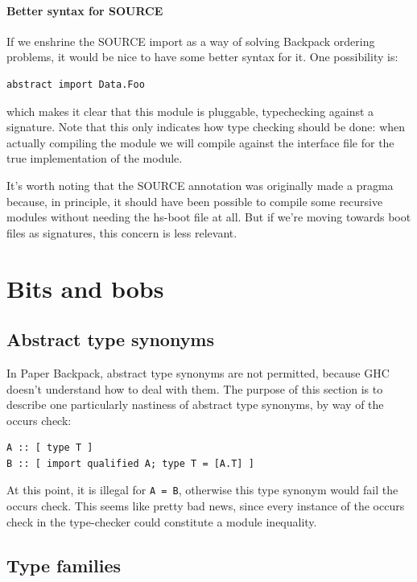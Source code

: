 \documentclass{article}
\begin{document}
\paragraph{Better syntax for SOURCE}  If we enshrine the SOURCE import
as a way of solving Backpack ordering problems, it would be nice to have
some better syntax for it. One possibility is:

\begin{verbatim}
abstract import Data.Foo
\end{verbatim}

which makes it clear that this module is pluggable, typechecking against
a signature.  Note that this only indicates how type checking should be
done: when actually compiling the module we will compile against the
interface file for the true implementation of the module.

It's worth noting that the SOURCE annotation was originally made a
pragma because, in principle, it should have been possible to compile
some recursive modules without needing the hs-boot file at all. But if
we're moving towards boot files as signatures, this concern is less
relevant.

\section{Bits and bobs}

\subsection{Abstract type synonyms}

In Paper Backpack, abstract type synonyms are not permitted, because GHC doesn't
understand how to deal with them.  The purpose of this section is to describe
one particularly nastiness of abstract type synonyms, by way of the occurs check:

\begin{verbatim}
A :: [ type T ]
B :: [ import qualified A; type T = [A.T] ]
\end{verbatim}

At this point, it is illegal for \verb|A = B|, otherwise this type synonym would
fail the occurs check.  This seems like pretty bad news, since every instance
of the occurs check in the type-checker could constitute a module inequality.

\subsection{Type families}
\end{document}
